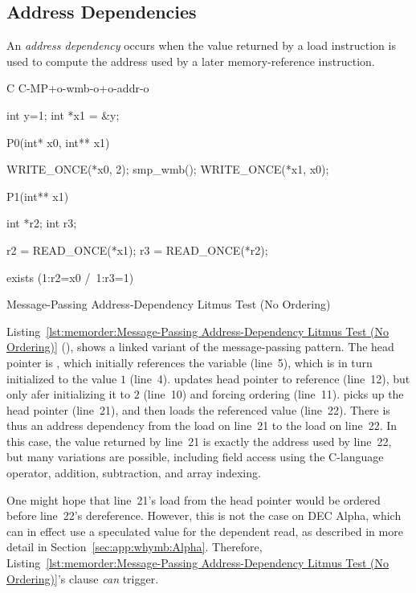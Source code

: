 \subsection{Address Dependencies}
\label{sec:memorder:Address Dependencies}

An \emph{address dependency} occurs when the value returned by a load
instruction is used to compute the address used by a later memory-reference
instruction.

\begin{listing}[tbp]
{ \scriptsize
\begin{verbbox}[\LstLineNo]
C C-MP+o-wmb-o+o-addr-o

{
int y=1;
int *x1 = &y;
}

P0(int* x0, int** x1) {

  WRITE_ONCE(*x0, 2);
  smp_wmb();
  WRITE_ONCE(*x1, x0);

}

P1(int** x1) {

  int *r2;
  int r3;

  r2 = READ_ONCE(*x1);
  r3 = READ_ONCE(*r2);

}

exists (1:r2=x0 /\ 1:r3=1)
\end{verbbox}
}
\centering
\theverbbox
\caption{Message-Passing Address-Dependency Litmus Test (No Ordering)}
\label{lst:memorder:Message-Passing Address-Dependency Litmus Test (No Ordering)}
\end{listing}

Listing~\ref{lst:memorder:Message-Passing Address-Dependency Litmus Test (No Ordering)}
(),
shows a linked variant of the message-passing pattern.
The head pointer is , which initially
references the  variable  (line~5), which is in turn 
initialized to the value $1$ (line~4).
 updates head pointer  to reference  (line~12),
but only afer initializing it to $2$ (line~10) and forcing ordering
(line~11).
 picks up the head pointer  (line~21), and then loads
the referenced value (line~22).
There is thus an address dependency from the load on line~21 to the
load on line~22.
In this case, the value returned by line~21 is exactly the address
used by line~22, but many variations are possible,
including field access using the C-language \co{->} operator,
addition, subtraction, and array indexing.

One might hope that line~21's load from the head pointer would be ordered
before line~22's dereference.
However, this is not the case on DEC Alpha, which can in effect use
a speculated value for the dependent read, as described in more detail in
Section~\ref{sec:app:whymb:Alpha}.
Therefore,
Listing~\ref{lst:memorder:Message-Passing Address-Dependency Litmus Test (No Ordering)}'s
 clause \emph{can} trigger.

